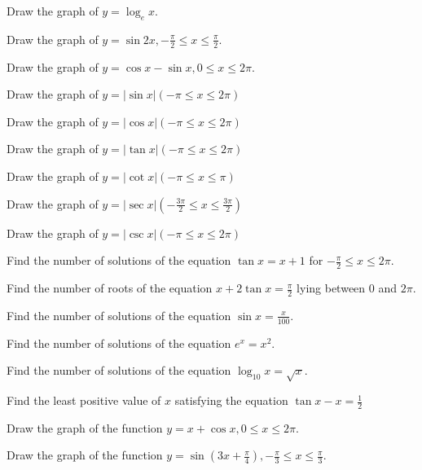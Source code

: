 \item Draw the graph of $y = \log_ex$.

\item Draw the graph of $y = \sin2x, -\frac{\pi}{2}\leq x\leq\frac{\pi}{2}$.

\item Draw the graph of $y = \cos x - \sin x, 0\leq x\leq2\pi$.

\item Draw the graph of $y = |\sin x|(-\pi\leq x\leq 2\pi)$

\item Draw the graph of $y = |\cos x|(-\pi\leq x\leq 2\pi)$

\item Draw the graph of $y = |\tan x|(-\pi\leq x\leq 2\pi)$

\item Draw the graph of $y = |\cot x|(-\pi\leq x\leq \pi)$

\item Draw the graph of $y = |\sec x|\left(-\frac{3\pi}{2}\leq x\leq \frac{3\pi}{2}\right)$

\item Draw the graph of $y = |\csc x|(-\pi\leq x\leq 2\pi)$

\item Find the number of solutions of the equation $\tan x = x + 1$ for $-\frac{\pi}{2}\leq x \leq
    2\pi$.

\item Find the number of roots of the equation $x + 2\tan x = \frac{\pi}{2}$ lying between $0$ and
    $2\pi$.

\item Find the number of solutions of the equation $\sin x = \frac{x}{100}$.

\item Find the number of solutions of the equation $e^x = x^2$.

\item Find the number of solutions of the equation $\log_{10}x = \sqrt{x}$.

\item Find the least positive value of $x$ satisfying the equation $\tan x - x = \frac{1}{2}$

\item Draw the graph of the function $y = x + \cos x, 0\leq x\leq 2\pi$.

\item Draw the graph of the function $y = \sin \left(3x + \frac{\pi}{4}\right), -\frac{\pi}{3}\leq x\leq
    \frac{\pi}{3}$.

